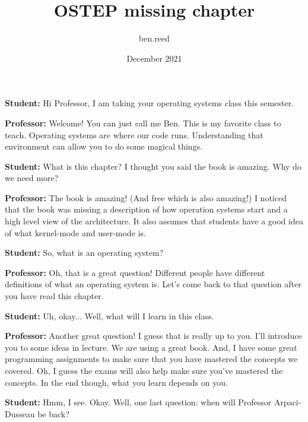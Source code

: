 \documentclass{article}
\title{OSTEP missing chapter}
\author{ben.reed }
\date{December 2021}
\begin{document}
\textbf{Student:} Hi Professor, I am taking your operating systems class this semester.

\vspace{\baselineskip}

\textbf{Professor:} Welcome! You can just call me Ben.  This is my favorite class to teach. Operating systems are where our code runs. Understanding that environment can allow you to do some magical things.

\vspace{\baselineskip}

\textbf{Student:} What is this chapter? I thought you said the book is amazing. Why do we need more?

\vspace{\baselineskip}

\textbf{Professor:} The book is amazing! (And free which is also amazing!) I noticed that the book was missing a description of how operation systems start and a high level view of the architecture. It also assumes that students have a good idea of what kernel-mode and user-mode is.

\vspace{\baselineskip}

\textbf{Student:} So, what is an operating system?

\vspace{\baselineskip}

\textbf{Professor:} Oh, that is a great question! Different people have different definitions of what an operating system is. Let's come back to that question after you have read this chapter.

\vspace{\baselineskip}

\textbf{Student:} Uh, okay... Well, what will I learn in this class.

\vspace{\baselineskip}

\textbf{Professor:} Another great question! I guess that is really up to you. I'll introduce you to some ideas in lecture. We are using a great book. And, I have some great programming assignments to make sure that you have mastered the concepts we covered. Oh, I guess the exams will also help make sure you've mastered the concepts. In the end though, what you learn depends on you.

\vspace{\baselineskip}

\textbf{Student:} Hmm, I see. Okay. Well, one last question: when will Professor Arpaci-Dusseau be back?
\end{document}
